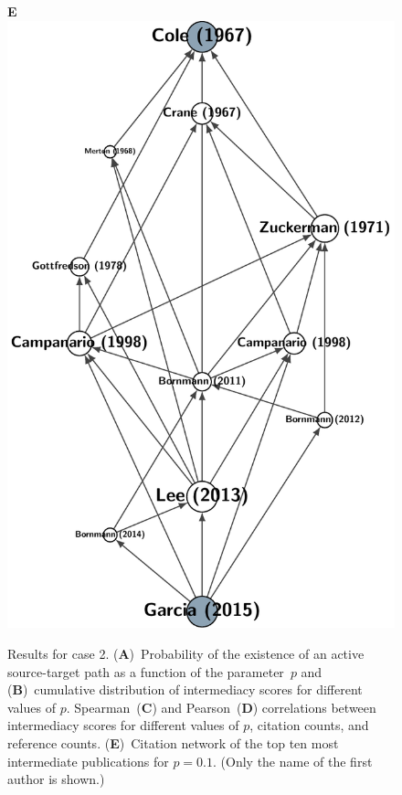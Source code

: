\documentclass[9pt,twocolumn,twoside]{pnas-alt} %
\theoremstyle{definition}
\begin{document}
\begin{figure}
\begin{minipage}{7.4cm}
  \end{minipage}\linewidth%
  \begin{minipage}{4cm}
    \vskip16pt\hskip16pt\textbf{\textsf{\footnotesize E}}\\\vskip-32pt%
    \includegraphics[width=\linewidth]{example_peerrev}
  \end{minipage}
  \caption{Results for case 2. (\textbf{A})~Probability of the existence of an active source-target path as a function of the parameter~$p$ and (\textbf{B})~cumulative distribution of intermediacy scores for different values of $p$. Spearman~(\textbf{C}) and Pearson~(\textbf{D}) correlations between intermediacy scores for different values of $p$, citation counts, and reference counts. (\textbf{E})~Citation network of the top ten most intermediate publications for $p = 0.1$. (Only the name of the first author is shown.)}
  \label{fig:pr}
\end{figure}
\end{document}
